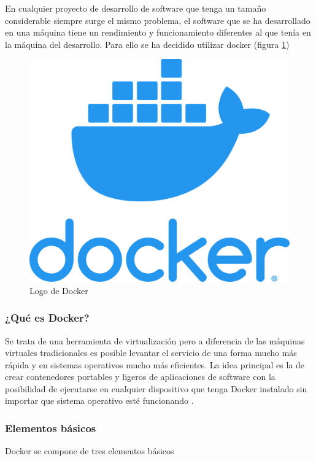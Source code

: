 En cualquier proyecto de desarrollo de software que tenga un tamaño considerable siempre surge el mismo problema, el software que se ha desarrollado en una máquina tiene un rendimiento y funcionamiento diferentes al que tenía en la máquina del desarrollo. Para ello se ha decidido utilizar docker (figura \ref{fig:docker_icon})

\begin{figure}[H]
    \centering
    \includegraphics[scale=0.05]{include/figuras/docker.png}
    \caption{Logo de Docker}
    \label{fig:docker_icon}
\end{figure}

\subsubsection{¿Qué es Docker?}
Se trata de una herramienta de virtualización pero a diferencia de las máquinas virtuales tradicionales es posible levantar el servicio de una forma mucho más rápida y en sistemas operativos mucho más eficientes. 
La idea principal es la de crear contenedores portables y ligeros de aplicaciones de software con la posibilidad de ejecutarse en cualquier dispositivo que tenga Docker instalado sin importar que sistema operativo esté funcionando \cite{docker}.

\subsubsection{Elementos básicos}
Docker se compone de tres elementos básicos

